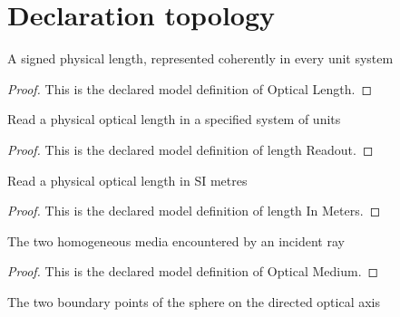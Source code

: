 \section{Declaration topology}
\begin{definition}
  \label{def:physics:phyx-mini-0477:phyxminiproblems-problemphyxmini0477-opticallength}
  A signed physical length, represented coherently in every unit system
\end{definition}
\begin{proof}
  This is the declared model definition of Optical Length.
\end{proof}
\begin{definition}
  \label{def:physics:phyx-mini-0477:phyxminiproblems-problemphyxmini0477-lengthreadout}
  Read a physical optical length in a specified system of units
\end{definition}
\begin{proof}
  This is the declared model definition of length Readout.
\end{proof}
\begin{definition}
  \label{def:physics:phyx-mini-0477:phyxminiproblems-problemphyxmini0477-lengthinmeters}
  Read a physical optical length in SI metres
\end{definition}
\begin{proof}
  This is the declared model definition of length In Meters.
\end{proof}
\begin{definition}
  \label{def:physics:phyx-mini-0477:phyxminiproblems-problemphyxmini0477-opticalmedium}
  The two homogeneous media encountered by an incident ray
\end{definition}
\begin{proof}
  This is the declared model definition of Optical Medium.
\end{proof}
\begin{definition}
  \label{def:physics:phyx-mini-0477:phyxminiproblems-problemphyxmini0477-spheresurface}
  The two boundary points of the sphere on the directed optical axis
\end{definition}
